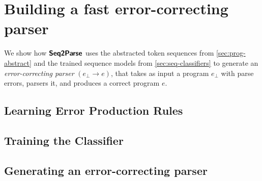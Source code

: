 \section{Building a fast error-correcting parser}
\label{sec:whole-system}

We show how $\bm{\mathsf{Seq2Parse}}$ uses the abstracted token sequences from
\autoref{sec:prog-abstract} and the trained sequence models from
\autoref{sec:seq-classifiers} to generate an \emph{error-correcting parser}
$(e_{\bot} \to e)$, that takes as input a program $e_{\bot}$ with parse errors,
parsers it, and produces a correct program $e$.


\subsection{Learning Error Production Rules}
\label{sec:whole-system:error-rules}



\subsection{Training the Classifier}
\label{sec:whole-system:training-classifier}



\subsection{Generating an error-correcting parser}
\label{sec:whole-system:building-ecp}
